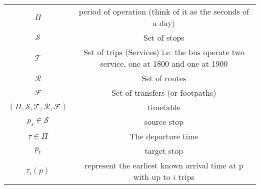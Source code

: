 \documentclass[preview]{standalone}
\begin{document}
\begin{tabular}{c|c}
    $\Pi$ & period of operation (think of it as the seconds of a day)\\
    $\mathcal{S}$ & Set of stops\\
    $\mathcal{T}$ & Set of trips (Services) i.e. the bus operate two service, one at 1800 and one at 1900\\
    $\mathcal{R}$ & Set of routes\\
    $\mathcal{F}$ & Set of transfers (or footpaths)\\
    $(\Pi, \mathcal{S}, \mathcal{T}, \mathcal{R}, \mathcal{F})$ & timetable \\
    $p_s \in \mathcal{S}$ & source stop \\
    $\tau \in \Pi$ & The departure time \\
    $p_t$ & target stop \\
    $\tau_i(p)$ & represent the earliest known arrival time at p with up to $i$ trips \\
\end{tabular}
\end{document}
